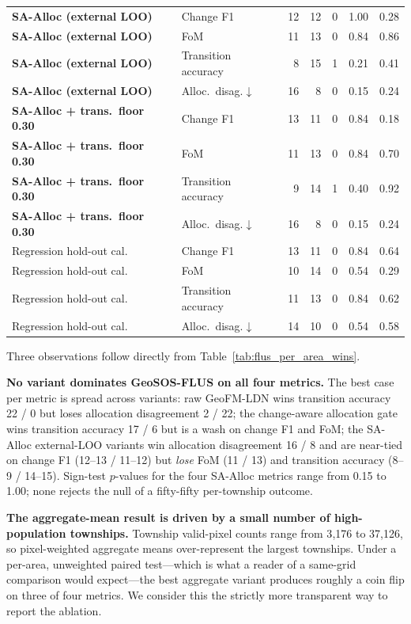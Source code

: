 \documentclass{article}
\begin{document}
\begin{table}[htbp]
{\begin{tabular}{@{}llrrrrr@{}}
\midrule
\textbf{SA-Alloc (external LOO)} & Change F1               & 12 & 12 & 0 & 1.00 & 0.28 \\
\textbf{SA-Alloc (external LOO)} & FoM                     & 11 & 13 & 0 & 0.84 & 0.86 \\
\textbf{SA-Alloc (external LOO)} & Transition accuracy     & 8  & 15 & 1 & 0.21 & 0.41 \\
\textbf{SA-Alloc (external LOO)} & Alloc.\ disag.$\downarrow$ & 16 & 8  & 0 & 0.15 & 0.24 \\
\midrule
\textbf{SA-Alloc + trans.\ floor 0.30} & Change F1               & 13 & 11 & 0 & 0.84 & 0.18 \\
\textbf{SA-Alloc + trans.\ floor 0.30} & FoM                     & 11 & 13 & 0 & 0.84 & 0.70 \\
\textbf{SA-Alloc + trans.\ floor 0.30} & Transition accuracy     & 9  & 14 & 1 & 0.40 & 0.92 \\
\textbf{SA-Alloc + trans.\ floor 0.30} & Alloc.\ disag.$\downarrow$ & 16 & 8  & 0 & 0.15 & 0.24 \\
\midrule
Regression hold-out cal.\ & Change F1               & 13 & 11 & 0 & 0.84 & 0.64 \\
Regression hold-out cal.\ & FoM                     & 10 & 14 & 0 & 0.54 & 0.29 \\
Regression hold-out cal.\ & Transition accuracy     & 11 & 13 & 0 & 0.84 & 0.62 \\
Regression hold-out cal.\ & Alloc.\ disag.$\downarrow$ & 14 & 10 & 0 & 0.54 & 0.58 \\
\bottomrule
\end{tabular}}
\end{table}

Three observations follow directly from Table~\ref{tab:flus_per_area_wins}.

\textbf{No variant dominates GeoSOS-FLUS on all four metrics.} The best case per metric is spread across variants: raw GeoFM-LDN wins transition accuracy 22 / 0 but loses allocation disagreement 2 / 22; the change-aware allocation gate wins transition accuracy 17 / 6 but is a wash on change F1 and FoM; the SA-Alloc external-LOO variants win allocation disagreement 16 / 8 and are near-tied on change F1 (12--13 / 11--12) but \emph{lose} FoM (11 / 13) and transition accuracy (8--9 / 14--15). Sign-test $p$-values for the four SA-Alloc metrics range from 0.15 to 1.00; none rejects the null of a fifty-fifty per-township outcome.

\textbf{The aggregate-mean result is driven by a small number of high-population townships.} Township valid-pixel counts range from 3{,}176 to 37{,}126, so pixel-weighted aggregate means over-represent the largest townships. Under a per-area, unweighted paired test---which is what a reader of a same-grid comparison would expect---the best aggregate variant produces roughly a coin flip on three of four metrics. We consider this the strictly more transparent way to report the ablation.
\end{document}
